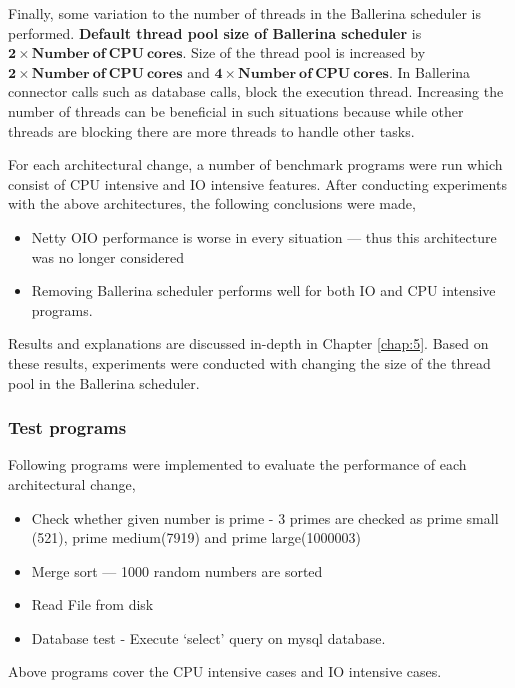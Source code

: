 %

Finally, some variation to the number of threads in the Ballerina scheduler is performed. \textbf{Default thread pool size of Ballerina scheduler} is \textbf{$ \boldsymbol{2} \times \boldsymbol{Number\: of\: CPU\: cores}$}. Size of the thread pool is increased by \textbf{$ \boldsymbol{2} \times \boldsymbol{Number\: of\: CPU\: cores}$} and \textbf{$ \boldsymbol{4} \times \boldsymbol{Number\: of\: CPU\: cores}$}. In Ballerina connector calls such as database calls, block the execution thread. Increasing the number of threads can be beneficial in such situations because while other threads are blocking there are more threads to handle other tasks. 

For each architectural change, a number of benchmark programs were run which consist of CPU intensive and IO intensive features.
After conducting experiments with the above architectures, the following conclusions were made,

\begin{itemize}
	\item Netty OIO performance is worse in every situation — thus this architecture was no longer considered
	\item Removing Ballerina scheduler performs well for both IO and CPU intensive programs.
\end{itemize} 

Results and explanations are discussed in-depth in Chapter \ref{chap:5}. Based on these results, experiments were conducted with changing the size of the thread pool in the Ballerina scheduler.

\subsubsection{Test programs}

Following programs were implemented to evaluate the performance of each architectural change,

  \begin{itemize}
  	\item Check whether given number is prime - 3 primes are checked as prime small (521), prime medium(7919) and prime large(1000003)
  	\item Merge sort — 1000 random numbers are sorted
  	\item Read File from disk
  	\item Database test - Execute ‘select’ query on mysql database.
  \end{itemize} 
Above programs cover the CPU intensive cases and IO intensive cases. 

